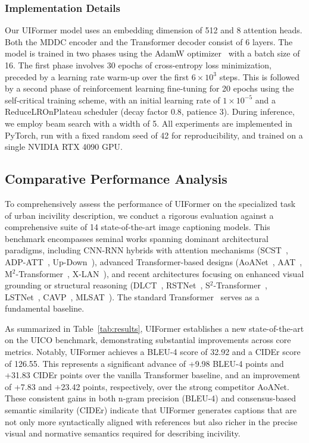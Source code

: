 \documentclass[lettersize,journal]{IEEEtran}
\begin{document}
	\subsubsection{Implementation Details}
	Our UIFormer model uses an embedding dimension of 512 and 8 attention heads. Both the MDDC encoder and the Transformer decoder consist of 6 layers. The model is trained in two phases using the AdamW optimizer~\cite{loshchilov2018decoupled} with a batch size of 16. The first phase involves 30 epochs of cross-entropy loss minimization, preceded by a learning rate warm-up over the first \(6\times10^3\) steps. This is followed by a second phase of reinforcement learning fine-tuning for 20 epochs using the self-critical training scheme, with an initial learning rate of \(1\times10^{-5}\) and a ReduceLROnPlateau scheduler (decay factor 0.8, patience 3). During inference, we employ beam search with a width of 5. All experiments are implemented in PyTorch, run with a fixed random seed of 42 for reproducibility, and trained on a single NVIDIA RTX 4090 GPU.
	
	
	
	\subsection{Comparative Performance Analysis}
	
	To comprehensively assess the performance of UIFormer on the specialized task of urban incivility description, we conduct a rigorous evaluation against a comprehensive suite of 14 state-of-the-art image captioning models. This benchmark encompasses seminal works spanning dominant architectural paradigms, including CNN-RNN hybrids with attention mechanisms (SCST~\cite{rennie2017self}, ADP-ATT~\cite{lu2017knowing}, Up-Down~\cite{anderson2018bottom}), advanced Transformer-based designs (AoANet~\cite{huang2019attention}, AAT~\cite{huang2019adaptively}, M\(^2\)-Transformer~\cite{cornia2020meshed}, X-LAN~\cite{pan2020x}), and recent architectures focusing on enhanced visual grounding or structural reasoning (DLCT~\cite{luo2021dual}, RSTNet~\cite{zhang2021rstnet}, S\(^2\)-Transformer~\cite{zeng2022s2}, LSTNet~\cite{ma2023towards}, CAVP~\cite{zha2019context}, MLSAT~\cite{xu2025multi}). The standard Transformer~\cite{vaswani2017attention} serves as a fundamental baseline.
	
	As summarized in Table~\ref{tab:results}, UIFormer establishes a new state-of-the-art on the UICO benchmark, demonstrating substantial improvements across core metrics. Notably, UIFormer achieves a BLEU-4 score of 32.92 and a CIDEr score of 126.55. This represents a significant advance of +9.98 BLEU-4 points and +31.83 CIDEr points over the vanilla Transformer baseline, and an improvement of +7.83 and +23.42 points, respectively, over the strong competitor AoANet. These consistent gains in both n-gram precision (BLEU-4) and consensus-based semantic similarity (CIDEr) indicate that UIFormer generates captions that are not only more syntactically aligned with references but also richer in the precise visual and normative semantics required for describing incivility.
	
\end{document}
